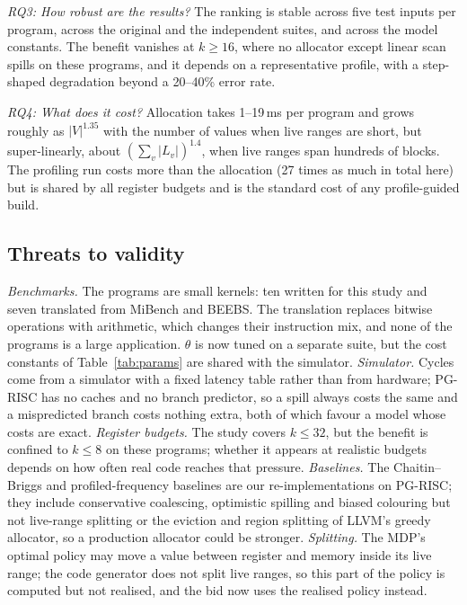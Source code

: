 \documentclass{ieeeaccess}
\begin{document}
\textit{RQ3: How robust are the results?} The ranking is stable across
five test inputs per program, across the original and the independent
suites, and across the model constants. The benefit vanishes at
$k\ge16$, where no allocator except linear scan spills on these
programs, and it depends on a representative profile, with a
step-shaped degradation beyond a 20--40\% error rate.

\textit{RQ4: What does it cost?} Allocation takes 1--19\,ms per program
and grows roughly as $|V|^{1.35}$ with the number of values when live
ranges are short, but super-linearly, about $(\sum_v|L_v|)^{1.4}$, when live
ranges span hundreds of blocks. The profiling run costs more than
the allocation (27 times as much in total here) but is shared by all
register budgets and is the standard cost of any profile-guided build.

\subsection{Threats to validity}

\textit{Benchmarks.} The programs are small kernels: ten written for
this study and seven translated from MiBench and BEEBS. The translation
replaces bitwise operations with arithmetic, which changes their
instruction mix, and none of the programs is a large application.
$\theta$ is now tuned on a separate suite, but the cost constants of
Table~\ref{tab:params} are shared with the simulator.
\textit{Simulator.} Cycles come from a simulator with a fixed latency
table rather than from hardware; PG-RISC has no caches and no branch
predictor, so a spill always costs the same and a mispredicted branch
costs nothing extra, both of which favour a model whose costs are
exact. \textit{Register budgets.} The study covers $k\le32$, but the
benefit is confined to $k\le8$ on these programs; whether it appears at
realistic budgets depends on how often real code reaches that
pressure. \textit{Baselines.} The Chaitin--Briggs and profiled-frequency
baselines are our re-implementations on PG-RISC; they include
conservative coalescing, optimistic spilling and biased colouring but
not live-range splitting or the eviction and region splitting of
LLVM's greedy allocator, so a production allocator could be stronger.
\textit{Splitting.} The MDP's optimal policy may move a value between
register and memory inside its live range; the code generator does not
split live ranges, so this part of the policy is computed but not
realised, and the bid now uses the realised policy instead.
\end{document}
